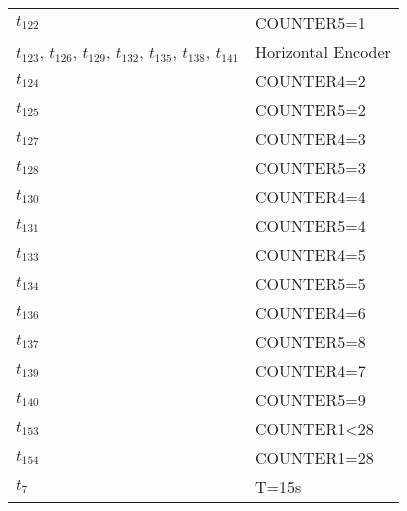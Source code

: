 \begin{longtable}{M{5cm}M{10cm}}
\hyperlink{completeNet:t122}{\hypertarget{completeTable:t122}{$t_{122}$}} & COUNTER5=1\\
\hyperlink{completeNet:t123}{\hypertarget{completeTable:t123}{$t_{123}$}}, \hyperlink{completeNet:t126}{\hypertarget{completeTable:t126}{$t_{126}$}}, \hyperlink{completeNet:t129}{\hypertarget{completeTable:t129}{$t_{129}$}}, \hyperlink{completeNet:t132}{\hypertarget{completeTable:t132}{$t_{132}$}}, \hyperlink{completeNet:t135}{\hypertarget{completeTable:t135}{$t_{135}$}}, \hyperlink{completeNet:t138}{\hypertarget{completeTable:t138}{$t_{138}$}}, \hyperlink{completeNet:t141}{\hypertarget{completeTable:t141}{$t_{141}$}} & Horizontal Encoder\\
\hyperlink{completeNet:t124}{\hypertarget{completeTable:t124}{$t_{124}$}} & COUNTER4=2\\
\hyperlink{completeNet:t125}{\hypertarget{completeTable:t125}{$t_{125}$}} & COUNTER5=2\\
\hyperlink{completeNet:t127}{\hypertarget{completeTable:t127}{$t_{127}$}} & COUNTER4=3\\
\hyperlink{completeNet:t128}{\hypertarget{completeTable:t128}{$t_{128}$}} & COUNTER5=3\\
\hyperlink{completeNet:t130}{\hypertarget{completeTable:t130}{$t_{130}$}} & COUNTER4=4\\
\hyperlink{completeNet:t131}{\hypertarget{completeTable:t131}{$t_{131}$}} & COUNTER5=4\\
\hyperlink{completeNet:t133}{\hypertarget{completeTable:t133}{$t_{133}$}} & COUNTER4=5\\
\hyperlink{completeNet:t134}{\hypertarget{completeTable:t134}{$t_{134}$}} & COUNTER5=5\\
\hyperlink{completeNet:t136}{\hypertarget{completeTable:t136}{$t_{136}$}} & COUNTER4=6\\
\hyperlink{completeNet:t137}{\hypertarget{completeTable:t137}{$t_{137}$}} & COUNTER5=8\\
\hyperlink{completeNet:t139}{\hypertarget{completeTable:t139}{$t_{139}$}} & COUNTER4=7\\
\hyperlink{completeNet:t140}{\hypertarget{completeTable:t140}{$t_{140}$}} & COUNTER5=9\\
\hyperlink{completeNet:t153}{\hypertarget{completeTable:t153}{$t_{153}$}} & COUNTER1<28\\
\hyperlink{completeNet:t154}{\hypertarget{completeTable:t154}{$t_{154}$}} & COUNTER1=28\\
\hyperlink{completeNet:tt7}{\hypertarget{completeTable:tt7}{$t_{7}$}} & T=15s\\

\end{longtable}
